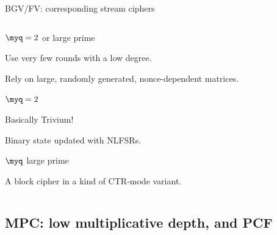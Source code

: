 \documentclass[presentation,aspectratio=1610]{beamer}
\begin{document}
\begin{frame}{BGV/FV: corresponding stream ciphers}
  
  \begin{columns}
    \begin{column}{0.5\textwidth}
      \begin{description}
        \setlength\itemsep{0.3cm}
      \item<1->[$\cdot$ASTA] $\myq = 2$ or large prime

        {\small Use very few rounds with a low degree.

          Rely on large, randomly generated, nonce-dependent matrices.}
          
      \item<2->[``Kreyvium''] \cite{FSE:CCFLNP16} $\myq = 2$

        {\small Basically Trivium!

          Binary state updated with NLFSRs.}
          
                
    \item<3->[HERA] \cite{AC:CHKLLL21} $\myq$ large prime 

        {\small A block cipher in a kind of CTR-mode variant.}
      \end{description}
    \end{column}
    \hfill
    \begin{column}{0.45\textwidth}
    \end{column}
  \end{columns}
\end{frame}


\subsection{MPC: low multiplicative depth, and PCF}
\end{document}
